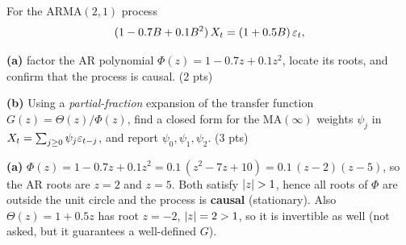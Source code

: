 \documentclass[11pt]{article}
\begin{document}
\statementstart
For the $\mathrm{ARMA}(2,1)$ process
\[
(1-0.7B+0.1B^2)\,X_t=(1+0.5B)\,\varepsilon_t,
\]

\textbf{(a)} factor the AR polynomial $\Phi(z)=1-0.7z+0.1z^2$, locate its roots, and confirm that the process is causal. \hfill(2 pts)

\textbf{(b)} Using a \emph{partial-fraction} expansion of the transfer function $G(z)=\Theta(z)/\Phi(z)$, find a closed form for the $\mathrm{MA}(\infty)$ weights $\psi_j$ in $X_t=\sum_{j\ge0}\psi_j\varepsilon_{t-j}$, and report $\psi_0,\psi_1,\psi_2$. \hfill(3 pts)
\statementend

\textbf{(a)} $\Phi(z)=1-0.7z+0.1z^2=0.1\,(z^2-7z+10)=0.1\,(z-2)(z-5)$, so the AR roots are $z=2$ and $z=5$. Both satisfy $\left\lvert z \right\rvert>1$, hence all roots of $\Phi$ are outside the unit circle and the process is \textbf{causal} (stationary). Also $\Theta(z)=1+0.5z$ has root $z=-2$, $\left\lvert z \right\rvert=2>1$, so it is invertible as well (not asked, but it guarantees a well-defined $G$).
\end{document}
